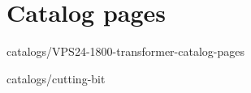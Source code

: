 \chapter{Catalog pages}


            {catalogs/VPS24-1800-transformer-catalog-pages}
	

            {catalogs/cutting-bit}
